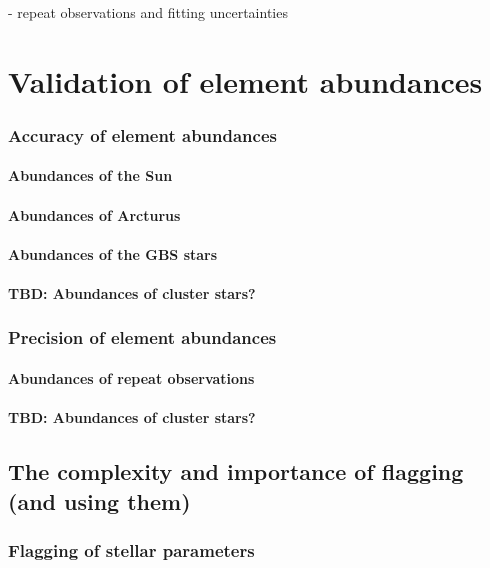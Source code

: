 \documentclass[fleqn,usenatbib,useAMS]{mnras}
\begin{document}
- repeat observations and fitting uncertainties

\section{Validation of element abundances} \label{sec:validation_ab}

\subsubsection{Accuracy of element abundances}

\paragraph*{Abundances of the Sun}

\paragraph*{Abundances of Arcturus}

\paragraph*{Abundances of the GBS stars}

\paragraph*{TBD: Abundances of cluster stars?}

\subsubsection{Precision of element abundances}

\paragraph*{Abundances of repeat observations}

\paragraph*{TBD: Abundances of cluster stars?}

\subsection{The complexity and importance of flagging (and using them)}

\subsubsection{Flagging of stellar parameters}
\end{document}
